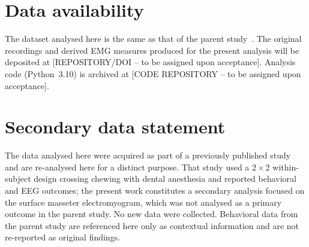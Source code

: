 ﻿%
\section*{Data availability}
The dataset analysed here is the same as that of the parent
study~\cite{espinoza2025}.
The original recordings and derived EMG measures produced for the present
analysis will be deposited at [REPOSITORY/DOI -- to be assigned upon acceptance].
Analysis code (Python~3.10) is archived at
[CODE REPOSITORY -- to be assigned upon acceptance].

\section*{Secondary data statement}
The data analysed here were acquired as part of a previously published
study~\cite{espinoza2025} and are re-analysed here for a distinct purpose.
That study used a 2\,$\times$\,2 within-subject design crossing chewing with
dental anesthesia and reported behavioral and EEG outcomes; the present work
constitutes a secondary analysis focused on the surface masseter electromyogram,
which was not analysed as a primary outcome in the parent study.
No new data were collected.
Behavioral data from the parent study are referenced here only as contextual
information and are not re-reported as original findings.

